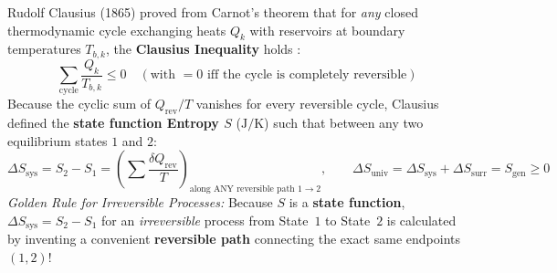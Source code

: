 Rudolf Clausius (1865) proved from Carnot's theorem that for \emph{any} closed thermodynamic cycle exchanging heats $Q_k$ with reservoirs at boundary temperatures $T_{b,k}$, the \textbf{Clausius Inequality} holds :
\begin{equation}\label{eq:08:clausius-ineq}
  \boxed{\sum_{\mathrm{cycle}} \frac{Q_k}{T_{b,k}} \le 0} \quad (\text{with } = 0 \text{ iff the cycle is completely reversible})
\end{equation}
Because the cyclic sum of $Q_{\mathrm{rev}}/T$ vanishes for every reversible cycle, Clausius defined the \textbf{state function Entropy $S$} ($\si{\joule\per\kelvin}$) such that between any two equilibrium states $1$ and $2$:
\begin{equation}\label{eq:08:entropy-def}
  \boxed{\Delta S_{\mathrm{sys}} = S_2 - S_1 = \left(\sum \frac{\delta Q_{\mathrm{rev}}}{T}\right)_{\text{along ANY reversible path } 1\to 2}}, \qquad \boxed{\Delta S_{\mathrm{univ}} = \Delta S_{\mathrm{sys}} + \Delta S_{\mathrm{surr}} = S_{\mathrm{gen}} \ge 0}
\end{equation}
\emph{Golden Rule for Irreversible Processes:} Because $S$ is a \textbf{state function}, $\Delta S_{\mathrm{sys}} = S_2 - S_1$ for an \emph{irreversible} process from State~$1$ to State~$2$ is calculated by inventing a convenient \textbf{reversible path} connecting the exact same endpoints $(1, 2)$!

